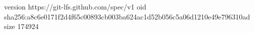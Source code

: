 version https://git-lfs.github.com/spec/v1
oid sha256:a8c6e0171f2d4f65c00893cb003ba624ac1d52b056c5a06d1210e49e796310ad
size 174924
